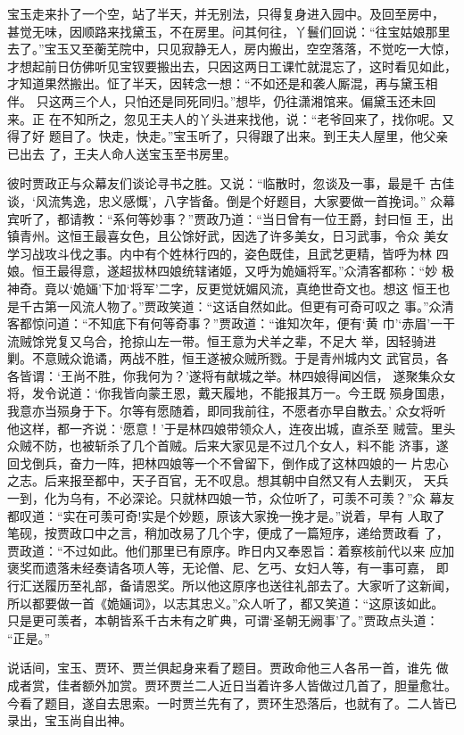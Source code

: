 宝玉走来扑了一个空，站了半天，并无别法，只得复身进入园中。及回至房中，
甚觉无味，因顺路来找黛玉，不在房里。问其何往，丫鬟们回说：“往宝姑娘那里
去了。”宝玉又至蘅芜院中，只见寂静无人，房内搬出，空空落落，不觉吃一大惊，
才想起前日仿佛听见宝钗要搬出去，只因这两日工课忙就混忘了，这时看见如此，
才知道果然搬出。怔了半天，因转念一想：“不如还是和袭人厮混，再与黛玉相伴。
只这两三个人，只怕还是同死同归。”想毕，仍往潇湘馆来。偏黛玉还未回来。正
在不知所之，忽见王夫人的丫头进来找他，说：“老爷回来了，找你呢。又得了好
题目了。快走，快走。”宝玉听了，只得跟了出来。到王夫人屋里，他父亲已出去
了，王夫人命人送宝玉至书房里。

彼时贾政正与众幕友们谈论寻书之胜。又说：“临散时，忽谈及一事，最是千
古佳谈，‘风流隽逸，忠义感慨’，八字皆备。倒是个好题目，大家要做一首挽词。”
众幕宾听了，都请教：“系何等妙事？”贾政乃道：“当日曾有一位王爵，封曰恒
王，出镇青州。这恒王最喜女色，且公馀好武，因选了许多美女，日习武事，令众
美女学习战攻斗伐之事。内中有个姓林行四的，姿色既佳，且武艺更精，皆呼为林
四娘。恒王最得意，遂超拔林四娘统辖诸姬，又呼为姽婳将军。”众清客都称：“妙
极神奇。竟以‘姽婳’下加‘将军’二字，反更觉妩媚风流，真绝世奇文也。想这
恒王也是千古第一风流人物了。”贾政笑道：“这话自然如此。但更有可奇可叹之
事。”众清客都惊问道：“不知底下有何等奇事？”贾政道：“谁知次年，便有‘黄
巾’‘赤眉’一干流贼馀党复又乌合，抢掠山左一带。恒王意为犬羊之辈，不足大
举，因轻骑进剿。不意贼众诡谲，两战不胜，恒王遂被众贼所戮。于是青州城内文
武官员，各各皆谓：‘王尚不胜，你我何为？’遂将有献城之举。林四娘得闻凶信，
遂聚集众女将，发令说道：‘你我皆向蒙王恩，戴天履地，不能报其万一。今王既
殒身国患，我意亦当殒身于下。尔等有愿随着，即同我前往，不愿者亦早自散去。’
众女将听他这样，都一齐说：‘愿意！’于是林四娘带领众人，连夜出城，直杀至
贼营。里头众贼不防，也被斩杀了几个首贼。后来大家见是不过几个女人，料不能
济事，遂回戈倒兵，奋力一阵，把林四娘等一个不曾留下，倒作成了这林四娘的一
片忠心之志。后来报至都中，天子百官，无不叹息。想其朝中自然又有人去剿灭，
天兵一到，化为乌有，不必深论。只就林四娘一节，众位听了，可羡不可羡？”众
幕友都叹道：“实在可羡可奇!实是个妙题，原该大家挽一挽才是。”说着，早有
人取了笔砚，按贾政口中之言，稍加改易了几个字，便成了一篇短序，递给贾政看
了，贾政道：“不过如此。他们那里已有原序。昨日内又奉恩旨：着察核前代以来
应加褒奖而遗落未经奏请各项人等，无论僧、尼、乞丐、女妇人等，有一事可嘉，
即行汇送履历至礼部，备请恩奖。所以他这原序也送往礼部去了。大家听了这新闻，
所以都要做一首《姽婳词》，以志其忠义。”众人听了，都又笑道：“这原该如此。
只是更可羡者，本朝皆系千古未有之旷典，可谓‘圣朝无阙事’了。”贾政点头道：
“正是。”

说话间，宝玉、贾环、贾兰俱起身来看了题目。贾政命他三人各吊一首，谁先
做成者赏，佳者额外加赏。贾环贾兰二人近日当着许多人皆做过几首了，胆量愈壮。
今看了题目，遂自去思索。一时贾兰先有了，贾环生恐落后，也就有了。二人皆已
录出，宝玉尚自出神。

